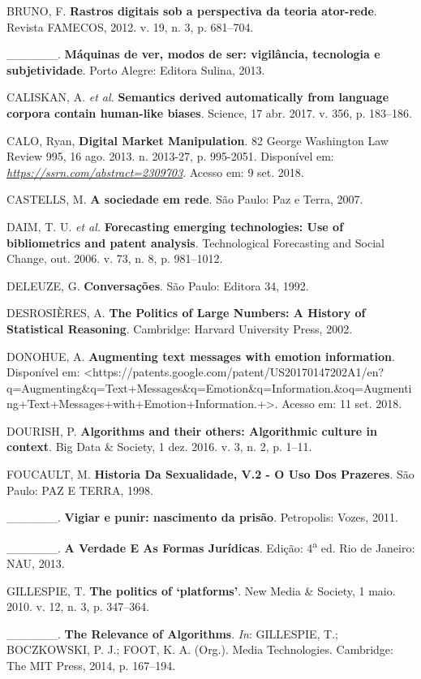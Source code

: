 BRUNO, F. \textbf{Rastros digitais sob a perspectiva da teoria
ator-rede}. Revista FAMECOS, 2012. v. 19, n. 3, p. 681--704.

\_\_\_\_\_\_. \textbf{Máquinas de ver, modos de ser: vigilância,
tecnologia e subjetividade}. Porto Alegre: Editora Sulina, 2013.

CALISKAN, A. \emph{et al.} \textbf{Semantics derived automatically from
language corpora contain human-like biases}. Science, 17 abr. 2017. v.
356, p. 183--186.

CALO, Ryan, \textbf{Digital Market Manipulation}. 82 George Washington
Law Review 995, 16 ago. 2013. n. 2013-27, p. 995-2051. Disponível em:
\href{https://ssrn.com/abstract=2309703}{\emph{https://ssrn.com/abstract=2309703}}.
Acesso em: 9 set. 2018.

CASTELLS, M. \textbf{A sociedade em rede}. São Paulo: Paz e Terra, 2007.

DAIM, T. U. \emph{et al.} \textbf{Forecasting emerging technologies: Use
of bibliometrics and patent analysis}. Technological Forecasting and
Social Change, out. 2006. v. 73, n. 8, p. 981--1012.

DELEUZE, G. \textbf{Conversações}. São Paulo: Editora 34, 1992.

DESROSIÈRES, A. \textbf{The Politics of Large Numbers: A History of
Statistical Reasoning}. Cambridge: Harvard University Press, 2002.

DONOHUE, A. \textbf{Augmenting text messages with emotion information}.
Disponível em:
\textless{}https://patents.google.com/patent/US20170147202A1/en?q=Augmenting\&q=Text+Messages\&q=Emotion\&q=Information.\&oq=Augmenting+Text+Messages+with+Emotion+Information.+\textgreater{}.
Acesso em: 11 set. 2018.

DOURISH, P. \textbf{Algorithms and their others: Algorithmic culture in
context}. Big Data \& Society, 1 dez. 2016. v. 3, n. 2, p. 1--11.

FOUCAULT, M. \textbf{Historia Da Sexualidade, V.2 - O Uso Dos Prazeres}.
São Paulo: PAZ E TERRA, 1998.

\_\_\_\_\_\_. \textbf{Vigiar e punir: nascimento da prisão}. Petropolis:
Vozes, 2011.

\_\_\_\_\_\_. \textbf{A Verdade E As Formas Jurídicas}. Edição:
4\textsuperscript{a} ed. Rio de Janeiro: NAU, 2013.

GILLESPIE, T. \textbf{The politics of `platforms'}. New Media \&
Society, 1 maio. 2010. v. 12, n. 3, p. 347--364.

\_\_\_\_\_\_. \textbf{The Relevance of Algorithms}. \emph{In}:
GILLESPIE, T.; BOCZKOWSKI, P. J.; FOOT, K. A. (Org.). Media
Technologies. Cambridge: The MIT Press, 2014, p. 167--194.

